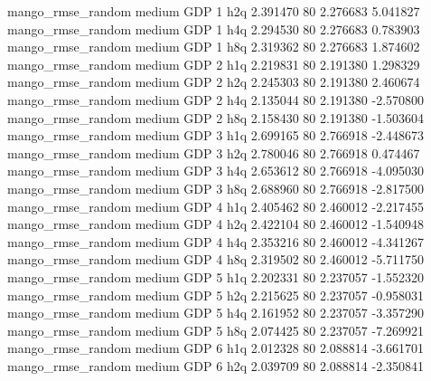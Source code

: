 mango_rmse_random     medium      GDP                 1                  h2q  2.391470 80       2.276683           5.041827
mango_rmse_random     medium      GDP                 1                  h4q  2.294530 80       2.276683           0.783903
mango_rmse_random     medium      GDP                 1                  h8q  2.319362 80       2.276683           1.874602
mango_rmse_random     medium      GDP                 2                  h1q  2.219831 80       2.191380           1.298329
mango_rmse_random     medium      GDP                 2                  h2q  2.245303 80       2.191380           2.460674
mango_rmse_random     medium      GDP                 2                  h4q  2.135044 80       2.191380          -2.570800
mango_rmse_random     medium      GDP                 2                  h8q  2.158430 80       2.191380          -1.503604
mango_rmse_random     medium      GDP                 3                  h1q  2.699165 80       2.766918          -2.448673
mango_rmse_random     medium      GDP                 3                  h2q  2.780046 80       2.766918           0.474467
mango_rmse_random     medium      GDP                 3                  h4q  2.653612 80       2.766918          -4.095030
mango_rmse_random     medium      GDP                 3                  h8q  2.688960 80       2.766918          -2.817500
mango_rmse_random     medium      GDP                 4                  h1q  2.405462 80       2.460012          -2.217455
mango_rmse_random     medium      GDP                 4                  h2q  2.422104 80       2.460012          -1.540948
mango_rmse_random     medium      GDP                 4                  h4q  2.353216 80       2.460012          -4.341267
mango_rmse_random     medium      GDP                 4                  h8q  2.319502 80       2.460012          -5.711750
mango_rmse_random     medium      GDP                 5                  h1q  2.202331 80       2.237057          -1.552320
mango_rmse_random     medium      GDP                 5                  h2q  2.215625 80       2.237057          -0.958031
mango_rmse_random     medium      GDP                 5                  h4q  2.161952 80       2.237057          -3.357290
mango_rmse_random     medium      GDP                 5                  h8q  2.074425 80       2.237057          -7.269921
mango_rmse_random     medium      GDP                 6                  h1q  2.012328 80       2.088814          -3.661701
mango_rmse_random     medium      GDP                 6                  h2q  2.039709 80       2.088814          -2.350841
